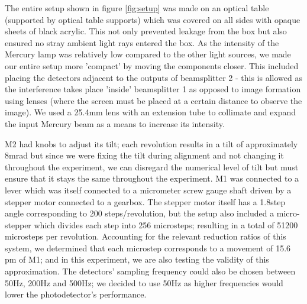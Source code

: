 \documentclass[journal]{Imperial_lab_report}
\begin{document}
The entire setup shown in figure \ref{fig:setup} was made on an optical table (supported by optical table supports) which was covered on all sides with opaque sheets of black acrylic. This not only prevented leakage from the box but also ensured no stray ambient light rays entered the box. As the intensity of the Mercury lamp was relatively low compared to the other light sources, we made our entire setup more 'compact' by moving the components closer. This included placing the detectors adjacent to the outputs of beamsplitter 2 - this is allowed as the interference takes place 'inside' beamsplitter 1 as opposed to image formation using lenses (where the screen must be placed at a certain distance to observe the image). We used a 25.4mm lens with an extension tube to collimate and expand the input Mercury beam as a means to increase its intensity.


M2 had knobs to adjust its tilt; each revolution results in a tilt of approximately 8mrad \cite{tilt_settings} but since we were fixing the tilt during alignment and not changing it throughout the experiment, we can disregard the numerical level of tilt but must ensure that it stays the same throughout the experiment. M1 was connected to a lever which was itself connected to a micrometer screw gauge shaft driven by a stepper motor connected to a gearbox. The stepper motor itself has a 1.8\degree step angle corresponding to 200 steps/revolution, but the setup also included a micro-stepper which divides each step into 256 microsteps; resulting in a total of 51200 microsteps per revolution. Accounting for the relevant reduction ratios of this system, we determined that each microstep corresponds to a movement of 15.6 pm of M1; and in this experiment, we are also testing the validity of this approximation. The detectors' sampling frequency could also be chosen between 50Hz, 200Hz and 500Hz; we decided to use 50Hz as higher frequencies would lower the photodetector's performance.

\end{document}
